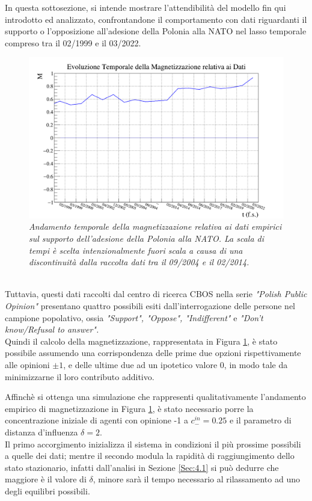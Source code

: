 \documentclass[letterpaper,10pt]{article}
\begin{document}
In questa sottosezione, si intende mostrare l'attendibilità del modello fin qui introdotto ed analizzato, confrontandone il comportamento con dati riguardanti il supporto o l'opposizione all'adesione della Polonia alla NATO nel lasso temporale compreso tra il 02/1999 e il 03/2022.
\begin{figure}[hb!]
\centering
\includegraphics[width = 0.9\linewidth]{poland_magnetization_graph.png}
\caption{\textit{Andamento temporale della magnetizzazione relativa ai dati empirici sul supporto dell'adesione della Polonia alla NATO. La scala di tempi è scelta intenzionalmente fuori scala a causa di una discontinuità dalla raccolta dati tra il 09/2004 e il 02/2014. }}
\label{Fig:20}
\end{figure}\\
Tuttavia, questi dati raccolti dal centro di ricerca CBOS \cite{cbos} nella serie \textit{"Polish Public Opinion"} presentano quattro possibili esiti dall'interrogazione delle persone nel campione popolativo, ossia \textit{"Support", "Oppose", "Indifferent"} e \textit{"Don't know/Refusal to answer".}
\\Quindi il calcolo della magnetizzazione, rappresentata in  Figura \ref{Fig:20}, è stato possibile assumendo una corrispondenza delle prime due opzioni rispettivamente alle opinioni $\pm1$, e delle ultime due ad un ipotetico valore 0, in modo tale da minimizzarne il loro contributo additivo. 

Affinchè si ottenga una simulazione che rappresenti qualitativamente l'andamento empirico di magnetizzazione in Figura \ref{Fig:20}, è stato necessario porre la concentrazione iniziale di agenti con opinione -1 a $c_{-}^{in}=0.25$ e il parametro di distanza d'influenza $\delta=2$.
\\ Il primo accorgimento inizializza il sistema in condizioni il più prossime possibili a quelle dei dati; mentre il secondo modula la rapidità di raggiungimento dello stato stazionario, infatti dall'analisi in Sezione \ref{Sec:4.1} si può dedurre che maggiore è il valore di $\delta$, minore sarà il tempo necessario al rilassamento ad uno degli equilibri possibili.
\end{document}
